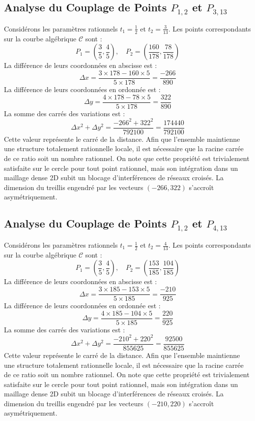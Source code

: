 \documentclass[12pt, a4paper]{article}
\begin{document}
\subsection{Analyse du Couplage de Points $P_{1,2}$ et $P_{3,13}$}
Considérons les paramètres rationnels $t_1 = \frac{1}{2}$ et $t_2 = \frac{3}{13}$.
Les points correspondants sur la courbe algébrique $\mathcal{C}$ sont :
$$ P_1 = \left( \frac{3}{5}, \frac{4}{5} \right), \quad P_2 = \left( \frac{160}{178}, \frac{78}{178} \right) $$
La différence de leurs coordonnées en abscisse est :
$$ \Delta x = \frac{3 \times 178 - 160 \times 5}{5 \times 178} = \frac{-266}{890} $$
La différence de leurs coordonnées en ordonnée est :
$$ \Delta y = \frac{4 \times 178 - 78 \times 5}{5 \times 178} = \frac{322}{890} $$
La somme des carrés des variations est :
$$ \Delta x^2 + \Delta y^2 = \frac{ -266^2 + 322^2 }{ 792100 } = \frac{ 174440 }{ 792100 } $$
Cette valeur représente le carré de la distance. Afin que l'ensemble maintienne une structure totalement rationnelle locale, il est nécessaire que la racine carrée de ce ratio soit un nombre rationnel. On note que cette propriété est trivialement satisfaite sur le cercle pour tout point rationnel, mais son intégration dans un maillage dense 2D subit un blocage d'interférences de réseaux croisés. La dimension du treillis engendré par les vecteurs $( -266, 322 )$ s'accroît asymétriquement.


\subsection{Analyse du Couplage de Points $P_{1,2}$ et $P_{4,13}$}
Considérons les paramètres rationnels $t_1 = \frac{1}{2}$ et $t_2 = \frac{4}{13}$.
Les points correspondants sur la courbe algébrique $\mathcal{C}$ sont :
$$ P_1 = \left( \frac{3}{5}, \frac{4}{5} \right), \quad P_2 = \left( \frac{153}{185}, \frac{104}{185} \right) $$
La différence de leurs coordonnées en abscisse est :
$$ \Delta x = \frac{3 \times 185 - 153 \times 5}{5 \times 185} = \frac{-210}{925} $$
La différence de leurs coordonnées en ordonnée est :
$$ \Delta y = \frac{4 \times 185 - 104 \times 5}{5 \times 185} = \frac{220}{925} $$
La somme des carrés des variations est :
$$ \Delta x^2 + \Delta y^2 = \frac{ -210^2 + 220^2 }{ 855625 } = \frac{ 92500 }{ 855625 } $$
Cette valeur représente le carré de la distance. Afin que l'ensemble maintienne une structure totalement rationnelle locale, il est nécessaire que la racine carrée de ce ratio soit un nombre rationnel. On note que cette propriété est trivialement satisfaite sur le cercle pour tout point rationnel, mais son intégration dans un maillage dense 2D subit un blocage d'interférences de réseaux croisés. La dimension du treillis engendré par les vecteurs $( -210, 220 )$ s'accroît asymétriquement.
\end{document}
